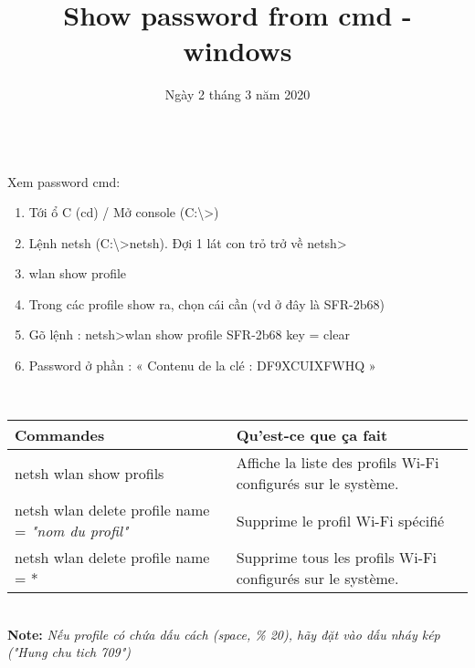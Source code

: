 \documentclass[12pt]{article}
\title{Show password from cmd - windows}
\date{Ngày 2 tháng 3 năm 2020}
\begin{document}
	\maketitle
	\ \\
	Xem password cmd:
	\begin{enumerate}
		\item Tới ổ C (cd) / Mở console (C:\textbackslash >)
		\item Lệnh netsh (C:\textbackslash >netsh). Đợi 1 lát con trỏ trở về netsh>
		\item wlan show profile
		\item Trong các profile show ra, chọn cái cần (vd ở đây là SFR-2b68)
		\item Gõ lệnh : netsh>wlan show profile SFR-2b68 key = clear
		\item Password ở phần : « Contenu de la clé            : DF9XCUIXFWHQ »
		
	\end{enumerate}
	\ \\
	\begin{center}
			\begin{tabular}{|P{7 cm}|P{7 cm}|}
			\hline 
			\textbf{Commandes} & \textbf{Qu'est-ce que ça fait} \\ 
			\hline 
			netsh wlan show profils & Affiche la liste des profils Wi-Fi configurés sur le système. \\ 
			\hline 
			netsh wlan delete profile name = \textit{"nom du profil"} & Supprime le profil Wi-Fi spécifié \\ 
			\hline 
			netsh wlan delete profile name = * & Supprime tous les profils Wi-Fi configurés sur le système. \\ 
			\hline 
		\end{tabular}
	\end{center}

	\ \\
	\textbf{Note:} \textit{Nếu profile có chứa dấu cách (space, \% 20), hãy đặt vào dấu nháy kép ("Hung chu tich 709")}

	
	
\end{document}
